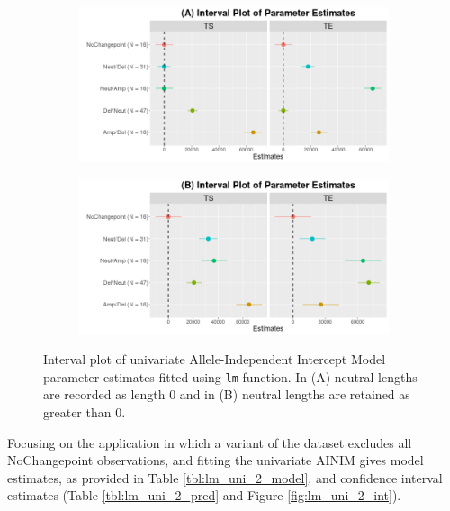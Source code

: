 \begin{figure}[H]
\vspace{0.5cm}
     \begin{subfigure}[t]{.49\textwidth}
      \centering
      \includegraphics[width = 1\textwidth]{../figures/Chapter_5/Univariate_lm_7_AI_Interval.png}
    \end{subfigure}%
     \begin{subfigure}[t]{.49\textwidth}
      \centering
       \includegraphics[width = 1\textwidth]{../figures/Chapter_5/Univariate_lm_7_Neut_AI_Interval.png}
    \end{subfigure} 
     \caption[Interval plot of univariate Allele-Independent Intercept Model parameter estimates fitted using \texttt{lm()} function.]{Interval plot of univariate Allele-Independent Intercept Model parameter estimates fitted using \texttt{lm} function. In (A) neutral lengths are recorded as length 0 and in (B) neutral lengths are retained as greater than 0.}
     \label{fig:lm_uni_1_int}
\end{figure}

Focusing on the application in which a variant of the dataset excludes all NoChangepoint observations, and fitting the univariate AINIM gives model estimates, as provided in Table \ref{tbl:lm_uni_2_model}, and confidence interval estimates (Table \ref{tbl:lm_uni_2_pred} and Figure  \ref{fig:lm_uni_2_int}).

